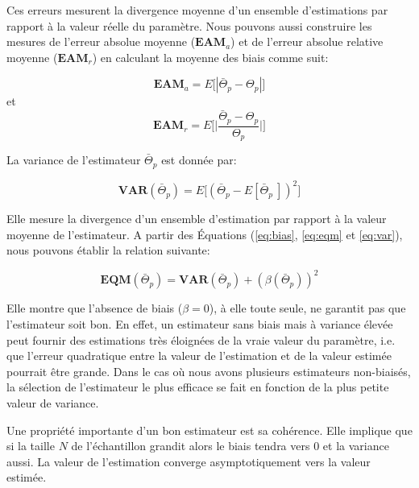 \vspace{5pt}

Ces erreurs mesurent la divergence moyenne d'un ensemble d'estimations par rapport à la valeur réelle du paramètre. Nous pouvons aussi construire les mesures de l'erreur absolue moyenne ($\textbf{EAM}_a $) et de l'erreur absolue relative moyenne  ($\textbf{EAM}_r $) en calculant la moyenne des biais comme suit:

\begin{equation}
    \textbf{EAM}_a = E\big[|\bar{\Theta}_p - \Theta_p|\big]
\end{equation}
et
\begin{equation}
    \textbf{EAM}_r =   E\Bigg[\Big|\frac{\bar{\Theta}_p - \Theta_p}{ \Theta_p}\Big|\Bigg]
\end{equation}

\vspace{5pt}

La variance de l'estimateur $\bar{\Theta}_p$ est donnée par:

\begin{equation}
    \textbf{VAR}(\bar{\Theta}_p) = E\big[(\bar{\Theta}_p - E[\bar{{\Theta}}_p~])^2 \big]
    \label{eq:var}
\end{equation}

\vspace{5pt}

Elle mesure la divergence d'un ensemble d'estimation par rapport à la valeur moyenne de l'estimateur. A partir des Équations (\ref{eq:bias}, \ref{eq:eqm} et \ref{eq:var}), nous pouvons établir la relation suivante:

\begin{equation}
    \textbf{EQM}(\bar{\Theta}_p) = \textbf{VAR}(\bar{\Theta}_p) + ( \beta (\bar{\Theta}_p))^2
\end{equation}

\vspace{5pt}

Elle montre que l’absence de biais ($\beta=0$), à elle toute seule, ne garantit pas que l'estimateur soit bon. En effet, un estimateur sans biais mais à variance élevée peut fournir des estimations très éloignées de la
vraie valeur du paramètre, i.e. que l'erreur quadratique entre  la valeur de l'estimation et de la valeur estimée pourrait être grande. Dans le cas où nous avons plusieurs estimateurs non-biaisés, la sélection de l'estimateur le plus efficace se fait en fonction de la plus petite valeur de variance.

Une propriété importante d'un bon estimateur est sa cohérence. Elle implique que si la taille $N$ de l'échantillon grandit alors le biais tendra vers 0 et la variance aussi.  La valeur de l'estimation converge asymptotiquement vers la valeur estimée.

